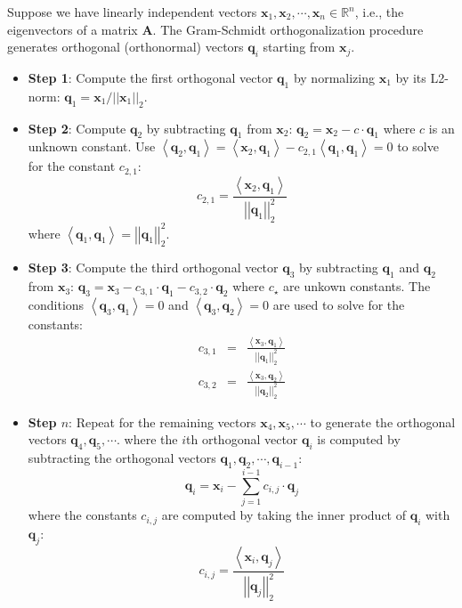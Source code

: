 \documentclass{article}[11pt]
\newcommand{\norm}[1]{\left|\left|#1\right|\right|}
\begin{document}
\begin{mdframed}
Suppose we have linearly independent vectors $\mathbf{x}_{1}, \mathbf{x}_{2}, \cdots, \mathbf{x}_{n}\in\mathbb{R}^{n}$, i.e., the eigenvectors of a matrix $\mathbf{A}$.
The Gram-Schmidt orthogonalization procedure generates orthogonal (orthonormal) vectors $\mathbf{q}_{i}$ starting from $\mathbf{x}_{j}$.
\begin{itemize}[leftmargin=16pt]
   \item{\textbf{Step 1}: Compute the first orthogonal vector $\mathbf{q}_{1}$ by normalizing $\mathbf{x}_{1}$ by its L2-norm:  $\mathbf{q}_{1} =  \mathbf{x}_{1}/\norm{\mathbf{x}_{1}}_{2}$.}
   \item{\textbf{Step 2}: Compute $\mathbf{q}_{2}$ by subtracting $\mathbf{q}_{1}$ from $\mathbf{x}_{2}$: $\mathbf{q}_{2} = \mathbf{x}_{2} - c\cdot\mathbf{q}_{1}$
      where $c$ is an unknown constant. Use $\left<\mathbf{q}_{2},\mathbf{q}_{1}\right> = \left<\mathbf{x}_{2},\mathbf{q}_{1}\right> - c_{2,1}\left<\mathbf{q}_{1},\mathbf{q}_{1}\right> = 0$ 
      to solve for the constant $c_{2,1}$:
      \begin{equation*}
         c_{2,1} = \frac{\left<\mathbf{x}_{2},\mathbf{q}_{1}\right>}{\norm{\mathbf{q}_{1}}_{2}^{2}}
      \end{equation*}
      where $\left<\mathbf{q}_{1},\mathbf{q}_{1}\right> = \norm{\mathbf{q}_{1}}_{2}^{2}$.}
   \item{\textbf{Step 3}: Compute the third orthogonal vector $\mathbf{q}_{3}$ by subtracting $\mathbf{q}_{1}$ and $\mathbf{q}_{2}$ from $\mathbf{x}_{3}$: $\mathbf{q}_{3} = \mathbf{x}_{3} - c_{3,1}\cdot\mathbf{q}_{1} - c_{3,2}\cdot\mathbf{q}_{2}$
      where $c_{\star}$ are unkown constants. The conditions $\left<\mathbf{q}_{3},\mathbf{q}_{1}\right> = 0$
      and $\left<\mathbf{q}_{3},\mathbf{q}_{2}\right> = 0$ are used to solve for the constants:
      \begin{eqnarray*}
         c_{3,1} & = & \frac{\left<\mathbf{x}_{3},\mathbf{q}_{1}\right>}{\norm{\mathbf{q}_{1}}_{2}^{2}} \\
         c_{3,2} & = &  \frac{\left<\mathbf{x}_{3},\mathbf{q}_{2}\right>}{\norm{\mathbf{q}_{2}}_{2}^{2}}
      \end{eqnarray*}}
   \item{\textbf{Step $n$}: Repeat for the remaining vectors $\mathbf{x}_{4},\mathbf{x}_{5},\cdots$ to generate the orthogonal vectors $\mathbf{q}_{4},\mathbf{q}_{5},\cdots$.
   where the $i$th orthogonal vector $\mathbf{q}_{i}$ is computed by subtracting the orthogonal vectors $\mathbf{q}_{1},\mathbf{q}_{2},\cdots,\mathbf{q}_{i-1}$:
   \begin{equation*}
      \mathbf{q}_{i} = \mathbf{x}_{i} - \sum_{j=1}^{i-1}c_{i,j}\cdot\mathbf{q}_{j}
   \end{equation*}
   where the constants $c_{i,j}$ are computed by taking the inner product of $\mathbf{q}_{i}$ with $\mathbf{q}_{j}$:
   \begin{equation*}
      c_{i,j} = \frac{\left<\mathbf{x}_{i},\mathbf{q}_{j}\right>}{\norm{\mathbf{q}_{j}}_{2}^{2}}
   \end{equation*}}
\end{itemize}
\end{mdframed}
\end{document}
